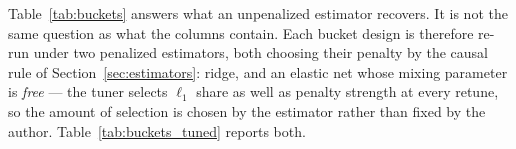 Table~\ref{tab:buckets} answers what an unpenalized estimator recovers.
It is not the same question as what the columns contain. Each bucket
design is therefore re-run under two penalized estimators, both choosing
their penalty by the causal rule of Section~\ref{sec:estimators}: ridge,
and an elastic net whose mixing parameter is \emph{free} --- the tuner
selects $\ell_1$ share as well as penalty strength at every retune, so
the amount of selection is chosen by the estimator rather than fixed by
the author. Table~\ref{tab:buckets_tuned} reports both.

